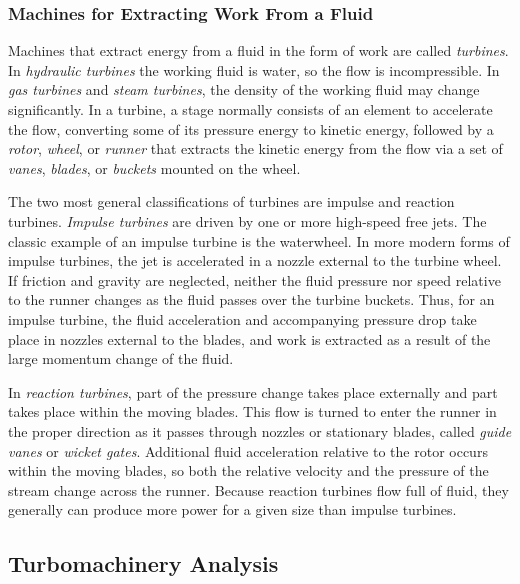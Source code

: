 \subsubsection{Machines for Extracting Work From a Fluid}
Machines that extract energy from a fluid in the form of work are called \textit{turbines}.
In \textit{hydraulic turbines} the working fluid is water, so the flow is incompressible.
In \textit{gas turbines} and \textit{steam turbines}, the density of the working fluid may change significantly.
In a turbine, a stage normally consists of an element to accelerate the flow, converting some of its pressure energy to kinetic energy, followed by a \textit{rotor}, \textit{wheel}, or \textit{runner} that extracts the kinetic energy from the flow via a set of \textit{vanes}, \textit{blades}, or \textit{buckets} mounted on the wheel.

The two most general classifications of turbines are impulse and reaction turbines.
\textit{Impulse turbines} are driven by one or more high-speed free jets.
The classic example of an impulse turbine is the waterwheel.
In more modern forms of impulse turbines, the jet is accelerated in a nozzle external to the turbine wheel.
If friction and gravity are neglected, neither the fluid pressure nor speed relative to the runner changes as the fluid passes over the turbine buckets.
Thus, for an impulse turbine, the fluid acceleration and accompanying pressure drop take place in nozzles external to the blades, and work is extracted as a result of the large momentum change of the fluid.

In \textit{reaction turbines}, part of the pressure change takes place externally and part takes place within the moving blades.
This flow is turned to enter the runner in the proper direction as it passes through nozzles or stationary blades, called \textit{guide vanes} or \textit{wicket gates}.
Additional fluid acceleration relative to the rotor occurs within the moving blades, so both the relative velocity and the pressure of the stream change across the runner.
Because reaction turbines flow full of fluid, they generally can produce more power for a given size than impulse turbines.


\subsection{Turbomachinery Analysis}

